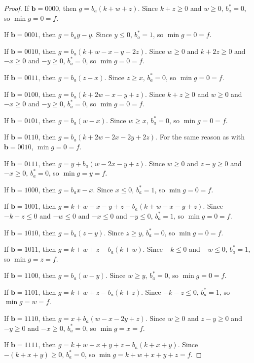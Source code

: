 \documentclass[11pt]{scrartcl}
\newcommand{\vc}[1]{\boldsymbol{#1}}
\begin{document}
\begin{proof}
If $\vc b = 0000$, then $g = b_a(k + w + z)$.
Since $k + z \ge 0 $ and $w \ge 0$, $b_a^* = 0$, so $\min g = 0 = f$.

If $\vc b = 0001$, then $g = b_ay - y$.
Since $y \le 0$, $b_a^* = 1$, so $\min g = 0 = f$.

If $\vc b = 0010$, then $g = b_a(k + w - x - y + 2z)$.
Since $w \ge 0 $ and $k + 2z \ge 0$ and $-x \ge 0$ and $-y \ge 0$, $b_a^* = 0$, so $\min g = 0 = f$.

If $\vc b = 0011$, then $g = b_a(z - x)$.
Since $z \ge x$, $b_a^* = 0$, so $\min g = 0 = f$.

If $\vc b = 0100$, then $g = b_a(k + 2w - x - y + z)$.
Since $k + z \ge 0$ and $w \ge 0$ and $-x \ge 0$ and $-y \ge 0$, $b_a^* = 0 $, so $\min g = 0 = f$.

If $\vc b = 0101$, then $g = b_a(w - x)$.
Since $w \ge x$, $b_a^* = 0$, so $\min g = 0 = f$.

If $\vc b = 0110$, then $g = b_a(k + 2w - 2x - 2y + 2z)$.
For the same reason as with $\vc b = 0010$, $\min g = 0 = f$.

If $\vc b = 0111$, then $g = y + b_a(w - 2x - y + z)$.
Since $w \ge 0$ and $z-y \ge 0$ and $-x \ge 0$, $b_a^* = 0$, so $\min g = y = f$.

If $\vc b = 1000$, then $g = b_ax - x$.
Since $x \le 0$, $b_a^* = 1$, so $\min g = 0 = f$.

If $\vc b = 1001$, then $g = k + w - x - y + z - b_a(k + w - x - y + z)$.
Since $-k - z \le 0$ and $-w \le 0$ and $-x \le 0 $ and $-y \le 0$, $b_a^* = 1$, so $\min g = 0 = f$.

If $\vc b = 1010$, then $g = b_a(z - y)$.
Since $z \ge y$, $b_a^* = 0$, so $\min g = 0 = f$.

If $\vc b = 1011$, then $g = k + w + z - b_a(k + w)$.
Since $-k \le 0$ and $-w \le 0$, $b_a^* = 1$, so $\min g = z = f$.

If $\vc b = 1100$, then $g = b_a(w - y)$.
Since $w \ge y$, $b_a^* = 0$, so $\min g = 0 = f$.

If $\vc b = 1101$, then $g = k + w + z - b_a(k + z)$.
Since $-k - z \le 0$, $b_a^* = 1$, so $\min g = w = f$.

If $\vc b = 1110$, then $g = x + b_a(w - x - 2y + z)$.
Since $w \ge 0$ and $z - y \ge 0$ and $-y \ge 0$ and $-x \ge 0$, $b_a^* = 0$, so $\min g = x = f$.

If $\vc b = 1111$, then $g = k + w + x + y + z - b_a(k + x + y)$.
Since $-(k + x + y) \ge 0$, $b_a^* = 0$, so $\min g = k + w + x + y + z = f$. 

\end{proof}
\end{document}
